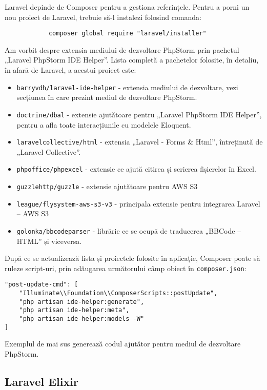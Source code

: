 		Laravel depinde de Composer pentru a gestiona referințele.
		Pentru a porni un nou proiect de Laravel, trebuie să-l instalezi folosind comanda:
		\begin{verbatim}
			composer global require "laravel/installer"
		\end{verbatim}

		Am vorbit despre extensia mediului de dezvoltare PhpStorm prin pachetul „Laravel PhpStorm IDE Helper”.
		Lista completă a pachetelor folosite, în detaliu, în afară de Laravel, a acestui proiect este:

		\begin{itemize}
			\item \verb|barryvdh/laravel-ide-helper| - extensia mediului de dezvoltare, vezi secțiunea în care prezint mediul de dezvoltare PhpStorm.
			\item \verb|doctrine/dbal| - extensie ajutătoare pentru „Laravel PhpStorm IDE Helper”, pentru a afla toate interacțiunile cu modelele Eloquent.
			\item \verb|laravelcollective/html| - extensia „Laravel - Forms \& Html”, întreținută de „Laravel Collective”.
			\item \verb|phpoffice/phpexcel| - extensie ce ajută citirea și scrierea fișierelor în Excel.
			\item \verb|guzzlehttp/guzzle| - extensie ajutătoare pentru AWS S3
			\item \verb|league/flysystem-aws-s3-v3| - principala extensie pentru integrarea Laravel -- AWS S3
			\item \verb|golonka/bbcodeparser| - librărie ce se ocupă de traducerea „BBCode -- HTML” și viceversa.
		\end{itemize}

		După ce se actualizează lista și proiectele folosite în aplicație, Composer poate să ruleze script-uri, prin adăugarea următorului câmp obiect în \verb|composer.json|:
		\begin{Verbatim}
"post-update-cmd": [
	"Illuminate\\Foundation\\ComposerScripts::postUpdate",
	"php artisan ide-helper:generate",
	"php artisan ide-helper:meta",
	"php artisan ide-helper:models -W"
]
	\end{Verbatim}
	Exemplul de mai sus generează codul ajutător pentru mediul de dezvoltare PhpStorm.

	\subsection{Laravel Elixir}

